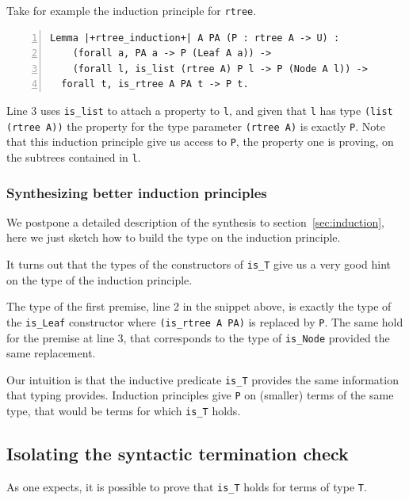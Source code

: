 \documentclass[sigplan,10pt,review]{acmart}\settopmatter{printfolios=true,printccs=false,printacmref=false}
\begin{document}
Take for example the induction principle for \lstinline+rtree+.

\begin{minipage}{\textwidth}\begin{lstlisting}[numbers=left]
Lemma |+rtree_induction+| A PA (P : rtree A -> U) :
    (forall a, PA a -> P (Leaf A a)) ->
    (forall l, is_list (rtree A) P l -> P (Node A l)) ->
  forall t, is_rtree A PA t -> P t.
\end{lstlisting}\end{minipage}

\noindent
Line 3 uses \lstinline+is_list+ to attach a property to \lstinline+l+,
and given that \lstinline+l+ has type \lstinline+(list (rtree A))+
the property for the type parameter \lstinline+(rtree A)+ is
exactly \lstinline+P+.
Note that this induction principle give us access to \lstinline+P+, the
property one is proving, on the subtrees contained in \lstinline+l+.

\subsubsection{Synthesizing better induction principles} %

We postpone a detailed description of the synthesis to
section~\ref{sec:induction}, here we just sketch how to
build the type on the induction principle.

It turns out that the types of the constructors of
\lstinline+is_T+ give us a very good hint on the type
of the induction principle.

The type of the first premise, line 2 in the snippet above,
is exactly the type of the \lstinline+is_Leaf+ constructor
where \lstinline+(is_rtree A PA)+ is replaced by \lstinline+P+.
The same hold for the premise at line 3, that corresponds to
the type of \lstinline+is_Node+ provided the same replacement.

Our intuition is that the inductive predicate \lstinline+is_T+
provides the same information that typing provides. Induction
principles give \lstinline+P+ on (smaller) terms of the same type,
that would be terms for which \lstinline+is_T+ holds.

\subsection{Isolating the syntactic termination check} %
\label{sec:idea:transparent}

As one expects, it is possible to prove that \lstinline+is_T+
holds for terms of type \lstinline+T+.
\end{document}
